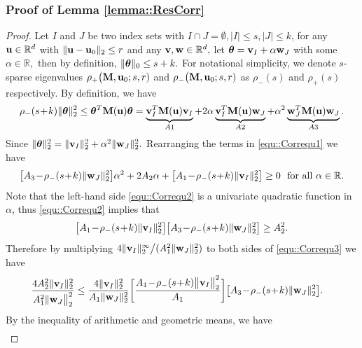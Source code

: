 \documentclass[twoside,11pt]{article}
\newcommand*{\BR}{\mathbb{R}}
\begin{document}
\subsubsection{Proof of Lemma \ref{lemma::ResCorr}}\label{proof::lemma::ResCorr}
\begin{proof} 
Let $I$ and  $J$ be two index sets with $ I \cap J = \emptyset , |I| \leq s ,|J|\leq k$, for any $\ub\in \BR^{d}$ with $\| \mathbf{u} - \mathbf{u}_0  \|_2 \leq r$
 and any $\vb, \wb\in \BR^{d},$ let $\bm{\theta} = \mathbf{v}_{I} + \alpha \mathbf{w}_{J}$ with some $\alpha \in \BR, $ then by definition, $\| \bm{\theta} \|_0\leq s + k.$ For notational simplicity, we denote $s$-sparse eigenvalues  $\rho_{+}\bigl(\mathbf{M}, \mathbf{u}_0;s, r)$ and $\rho_{-}\bigl(\mathbf{M}, \mathbf{u}_0;s, r)$ as $\rho_{-}(s)$ and $\rho_{+}(s)$ respectively.  By  definition, we have 
 \begin{align}\label{equ::Correqu1}
 \rho_{-}(s\!+\! k)  \| \bm{\theta} \|_2 ^2 \leq \bm{\theta} ^T\mathbf{M}(\mathbf{u}) \bm{\theta}  = \underbrace{\mathbf{v}_I^T \mathbf{M}(\mathbf{u}) \mathbf{v}_I}_{A1} + 2\alpha\underbrace{\mathbf{v}_I^T\mathbf{M}(\mathbf{u})\mathbf{w}_J}_{A2} + \alpha^2 \underbrace{\mathbf{w}_J^T \mathbf{M}(\mathbf{u})\mathbf{w}_J}_{A3}.
  \end{align}
 Since $ \| \bm{\theta}\|_2^2  =  \| \mathbf{v}_I   \|_2^2 + \alpha^2   \| \mathbf{w}_J  \|_2^2.$ Rearranging the terms in \eqref{equ::Correqu1} we have 
 \begin{align}\label{equ::Correqu2}
 \bigl [A_3 \!-\! \rho_{-}(s\!+\!k )  \| \wb_J \|_2^2\bigr ] \alpha^2 + 2A_2 \alpha + \bigl [A_1 \!-\! \rho_{-}(s\!+\!k )  \|\vb_I \|_2^2 \bigr] \geq 0~~\text{for all}~ \alpha \in \BR.
  \end{align}
  Note that the left-hand side \eqref{equ::Correqu2} is a univariate quadratic function in $\alpha$, thus \eqref{equ::Correqu2} implies that 
 \begin{align}\label{equ::Correqu3}
 \bigl [A_1\! -\! \rho_{-}(s\!+\!k )  \|\vb_I\|_2^2 \bigr ]\bigl[A_3\! -\! \rho_{-}(s\!+\!k )  \| \wb_J \|_2^2\bigr] \geq A_2^2.
 \end{align}
 Therefore by multiplying $4   \| \mathbf{v}_I   \|_2^\infty \big/ (A_1^2  \|\mathbf{w}_J  \|_2^2 )$  to both sides of \eqref{equ::Correqu3} we have 
 \begin{align}\label{equ::Correqu4}
 \frac{4 A_2^2 \|\vb_I \|_2^2}{A_1^2  \|\wb_J\big\|_2^2} & \leq\frac{4  \|\vb_I \|_2^2}{A_1 \|\wb_J\|_2^2} \biggl[ \frac{A_1\! -\!  \rho_{-}(s\!+\!k ) \big\|\vb_I\big\|_2^2}{A_1}\biggr]\bigl[A_3  \!-\! \rho_{-}(s\!+\!k  ) \|\wb_J \|_2^2 \bigr].
 \end{align}
 By the inequality of arithmetic and geometric means, we have 
 \begin{align*}

\end{align*}
\end{proof}
\end{document}
